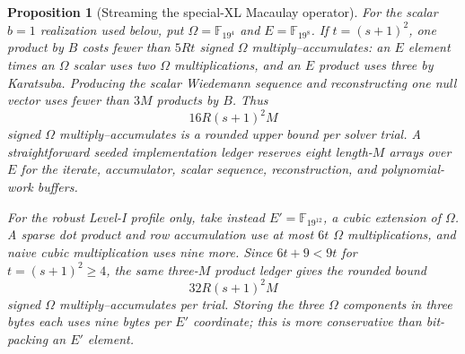 \documentclass[11pt]{article}
\newtheorem{proposition}[proposition]{Proposition}
\newcommand{\F}{\mathbb F}
\begin{document}
\begin{proposition}[Streaming the special-XL Macaulay operator]
For the scalar $b=1$ realization used below, put
$\Omega=\F_{19^4}$ and $E=\F_{19^8}$.  If
$t=(s+1)^2$, one product by $B$ costs fewer than $5Rt$ signed
$\Omega$ multiply--accumulates: an $E$ element times an $\Omega$ scalar uses
two $\Omega$ multiplications, and an $E$ product uses three by Karatsuba.
Producing the scalar Wiedemann sequence and reconstructing one null vector
uses fewer than $3M$ products by $B$.  Thus
\begin{equation}\label{eq:explicit-stream-work}
 16R(s+1)^2M
\end{equation}
signed $\Omega$ multiply--accumulates is a rounded upper bound per solver
trial.  A straightforward seeded implementation ledger reserves eight
length-$M$ arrays over $E$ for the iterate, accumulator, scalar sequence,
reconstruction, and polynomial-work buffers.

For the robust Level-I profile only, take instead
$E'=\F_{19^{12}}$, a cubic extension of $\Omega$.  A sparse dot product and
row accumulation use at most $6t$ $\Omega$ multiplications, and naive cubic
multiplication uses nine more.  Since $6t+9<9t$ for $t=(s+1)^2\ge4$, the same
three-$M$ product ledger gives the rounded bound
\begin{equation}\label{eq:explicit-stream-work-cubic}
 32R(s+1)^2M
\end{equation}
signed $\Omega$ multiply--accumulates per trial.  Storing the three
$\Omega$ components in three bytes each uses nine bytes per $E'$ coordinate;
this is more conservative than bit-packing an $E'$ element.
\end{proposition}
\end{document}
